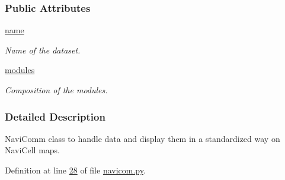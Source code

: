 \subsubsection*{Public Attributes}
\begin{DoxyCompactItemize}
\item 
\hypertarget{classnavicom_1_1navicom_1_1NaviCom_a950e5ebf199edea40d55c506b8aaf134}{
\hyperlink{classnavicom_1_1navicom_1_1NaviCom_a950e5ebf199edea40d55c506b8aaf134}{name}}
\label{classnavicom_1_1navicom_1_1NaviCom_a950e5ebf199edea40d55c506b8aaf134}

\begin{DoxyCompactList}\small\item\em Name of the dataset. \item\end{DoxyCompactList}\item 
\hypertarget{classnavicom_1_1navicom_1_1NaviCom_a56141660ddf29a36a8291e938246578c}{
\hyperlink{classnavicom_1_1navicom_1_1NaviCom_a56141660ddf29a36a8291e938246578c}{modules}}
\label{classnavicom_1_1navicom_1_1NaviCom_a56141660ddf29a36a8291e938246578c}

\begin{DoxyCompactList}\small\item\em Composition of the modules. \item\end{DoxyCompactList}\end{DoxyCompactItemize}


\subsubsection{Detailed Description}
NaviComm class to handle data and display them in a standardized way on NaviCell maps. 

Definition at line \hyperlink{navicom_8py_source_l00028}{28} of file \hyperlink{navicom_8py_source}{navicom.py}.



